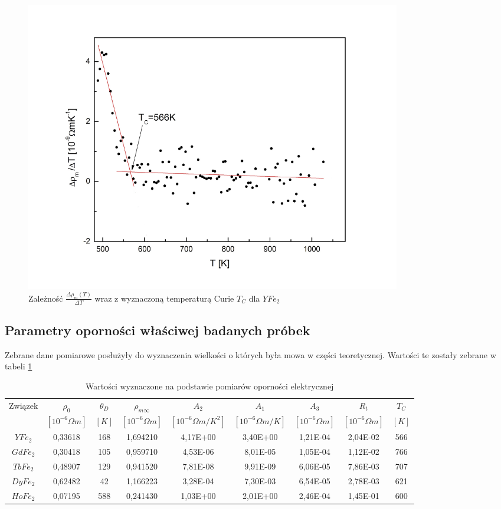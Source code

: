 \documentclass[a4paper,12pt]{article}
\numberwithin{equation}{section}
\begin{document}
\begin{figure}[ht]
    \centering
    \includegraphics[width =0.8\textwidth]{../img/opor/pochodnaY}
    \caption{Zależność $\frac{\Delta\rho_m(T)}{\Delta T}$ wraz z wyznaczoną temperaturą Curie $T_C$ dla $YFe_2$}
    \label{skladoweY}
\end{figure}


\clearpage
\subsection{Parametry oporności właściwej badanych próbek}

Zebrane dane pomiarowe posłużyły do wyznaczenia wielkości o których była mowa w części teoretycznej. Wartości te zostały zebrane w tabeli \ref{tabParametryOpor}

  \begin{table}[ht]
  \centering
  \footnotesize
  \caption{Wartości wyznaczone na podstawie pomiarów oporności elektrycznej}
  \label{tabParametryOpor}
  \begin{tabular}{|c|c|c|c|c|c|c|c|c|}
    \hline
Związek	&	$\rho_0$	&	$\theta_D$	&	$\rho_{m\infty}$	&	$A_2 $	&	$A_1$	&	$A_3$	&	$R_t $	&	$T_C$ \\
	&	$[10^{-6}{\Omega}m]$	&	$[K]$	&	$ [10^{-6}{\Omega}m]$	&	$ [10^{-6}{\Omega}m/K^2]$	&	$[10^{-6}{\Omega}m/K]$	&	$ [10^{-6}{\Omega}m]$	&	$ [10^{-6}{\Omega}m]$	&	$[K]$		\\\hline
$YFe_2$	&	0,33618	&	168	&	1,694210	&	4,17E+00	&	3,40E+00	&	1,21E-04	&	2,04E-02	&	566	\\\hline
$GdFe_2$	&	0,30418	&	105	&	0,959710	&	4,53E-06	&	8,01E-05	&	1,05E-04	&	1,12E-02	&	766	\\\hline
$TbFe_2$	&	0,48907	&	129	&	0,941520	&	7,81E-08	&	9,91E-09	&	6,06E-05	&	7,86E-03	&	707	\\\hline
$DyFe_2$	&	0,62482	&	42	&	1,166223	&	3,28E-04	&	7,30E-03	&	6,54E-05	&	2,78E-03	&	621	\\\hline
$HoFe_2$	&	0,07195	&	588	&	0,241430	&	1,03E+00	&	2,01E+00	&	2,46E-04	&	1,45E-01	&	600	\\\hline
  \end{tabular}
\end{table}
\end{document}
